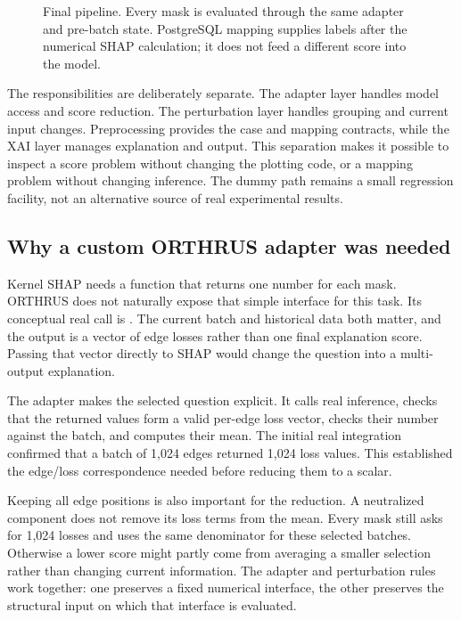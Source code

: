 \documentclass[11pt,a4paper]{article}
\newcommand{\code}[1]{\texttt{\detokenize{#1}}}
\begin{document}
\begin{figure}[htbp]
\centering
\resizebox{.96\linewidth}{!}{}
\caption{Final pipeline. Every mask is evaluated through the same adapter and
pre-batch state. PostgreSQL mapping supplies labels after the numerical SHAP
calculation; it does not feed a different score into the model.}
\label{fig:architecture}
\end{figure}

The responsibilities are deliberately separate. The adapter layer handles
model access and score reduction. The perturbation layer handles grouping and
current input changes. Preprocessing provides the case and mapping contracts,
while the XAI layer manages explanation and output. This separation makes it
possible to inspect a score problem without changing the plotting code, or a
mapping problem without changing inference. The dummy path remains a small
regression facility, not an alternative source of real experimental results.

\subsection{Why a custom ORTHRUS adapter was needed}
Kernel SHAP needs a function that returns one number for each mask. ORTHRUS does
not naturally expose that simple interface for this task. Its conceptual real
call is \code{model(batch, full_data, inference=True)}. The current batch and
historical data both matter, and the output is a vector of edge losses rather
than one final explanation score. Passing that vector directly to SHAP would
change the question into a multi-output explanation.

The adapter makes the selected question explicit. It calls real inference,
checks that the returned values form a valid per-edge loss vector, checks their
number against the batch, and computes their mean. The initial real integration
confirmed that a batch of 1,024 edges returned 1,024 loss values. This established
the edge/loss correspondence needed before reducing them to a scalar.

Keeping all edge positions is also important for the reduction. A neutralized
component does not remove its loss terms from the mean. Every mask still asks
for 1,024 losses and uses the same denominator for these selected batches.
Otherwise a lower score might partly come from averaging a smaller selection
rather than changing current information. The adapter and perturbation rules
work together: one preserves a fixed numerical interface, the other preserves
the structural input on which that interface is evaluated.
\end{document}
